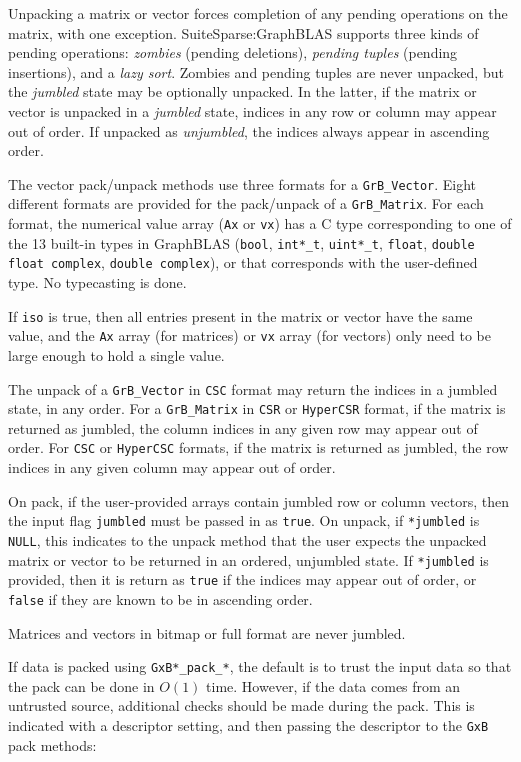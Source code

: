 \documentclass[12pt]{article}
\begin{document}
Unpacking a matrix or vector forces completion of any pending
operations on the matrix, with one exception.  SuiteSparse:GraphBLAS supports
three kinds of pending operations: {\em zombies} (pending deletions), {\em
pending tuples} (pending insertions), and a {\em lazy sort}.  Zombies and
pending tuples are never unpacked, but the {\em jumbled} state may be
optionally unpacked.  In the latter, if the matrix or vector is unpacked in a
{\em jumbled} state, indices in any row or column may appear out of order.  If
unpacked as {\em unjumbled}, the indices always appear in ascending order.

The vector pack/unpack methods use three formats for a
\verb'GrB_Vector'.  Eight different formats are provided for the
pack/unpack of a \verb'GrB_Matrix'.  For each format, the
numerical value array (\verb'Ax' or \verb'vx') has a C type corresponding to
one of the 13 built-in types in GraphBLAS (\verb'bool', \verb'int*_t',
\verb'uint*_t', \verb'float', \verb'double' \verb'float complex', \verb'double complex'),
or that corresponds with the user-defined type.  No typecasting is
done.

If \verb'iso' is true, then all entries present in the matrix or vector
have the same value, and the \verb'Ax' array (for matrices) or \verb'vx' array
(for vectors) only need to be large enough to hold a single value.

The unpack of a \verb'GrB_Vector' in \verb'CSC' format may return the
indices in a jumbled state, in any order.
For a \verb'GrB_Matrix' in \verb'CSR' or \verb'HyperCSR' format, if the matrix
is returned as jumbled, the column indices in any given row may appear out of
order.  For \verb'CSC' or \verb'HyperCSC' formats, if the matrix is returned as
jumbled, the row indices in any given column may appear out of order.

On pack, if the user-provided arrays contain jumbled row or column
vectors, then the input flag \verb'jumbled' must be passed in as \verb'true'.
On unpack, if \verb'*jumbled' is \verb'NULL', this indicates to the unpack
method that the user expects the unpacked matrix or vector to be returned in an
ordered, unjumbled state.  If \verb'*jumbled' is provided, then it is return as
\verb'true' if the indices may appear out of order, or \verb'false' if they are
known to be in ascending order.

Matrices and vectors in bitmap or full format are never jumbled.

If data is packed using
\verb'GxB*_pack_*', the default is to trust the input data so that the
pack can be done in $O(1)$ time.  However, if the data comes from an
untrusted source, additional checks should be made during the pack.  This is
indicated with a descriptor setting, and then passing the descriptor
to the \verb'GxB' pack methods:
\end{document}
